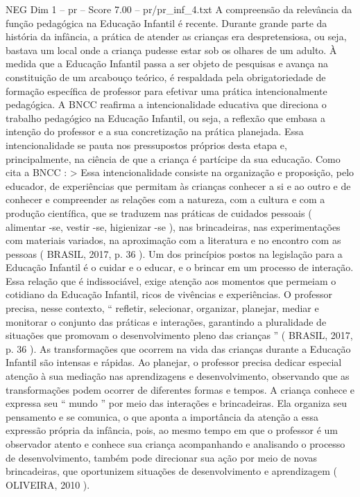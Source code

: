 \begin{textsample}{NEG Dim 1 – pr – Score 7.00 – pr/pr\_inf\_4.txt}  \label{ex:f1_neg_265}
A compreensão da relevância da função pedagógica na Educação Infantil é recente.
Durante grande parte da história da infância, a prática de atender as crianças era despretensiosa, ou seja, bastava um local onde a criança pudesse estar sob os olhares de um adulto.
À medida que a Educação Infantil passa a ser objeto de pesquisas e avança na constituição de um arcabouço teórico, é respaldada pela obrigatoriedade de formação específica de professor para efetivar uma prática intencionalmente pedagógica.
A BNCC reafirma a intencionalidade educativa que direciona o trabalho pedagógico na Educação Infantil, ou seja, a reflexão que embasa a intenção do professor e a sua concretização na prática planejada.
Essa intencionalidade se pauta nos pressupostos próprios desta etapa e, principalmente, na ciência de que a criança é partícipe da sua educação.
Como cita a BNCC : > Essa intencionalidade consiste na organização e proposição, pelo educador, de experiências que permitam às crianças conhecer a si e ao outro e de conhecer e compreender as relações com a natureza, com a cultura e com a produção científica, que se traduzem nas práticas de cuidados pessoais ( alimentar -se, vestir -se, higienizar -se ), nas brincadeiras, nas experimentações com materiais variados, na aproximação com a literatura e no encontro com as pessoas ( BRASIL, 2017, p. 36 ).
Um dos princípios postos na legislação para a Educação Infantil é o cuidar e o educar, e o brincar em um processo de interação.
Essa relação que é indissociável, exige atenção aos momentos que permeiam o cotidiano da Educação Infantil, ricos de vivências e experiências.
O professor precisa, nesse contexto, “ refletir, selecionar, organizar, planejar, mediar e monitorar o conjunto das práticas e interações, garantindo a pluralidade de situações que promovam o desenvolvimento pleno das crianças ” ( BRASIL, 2017, p. 36 ).
As transformações que ocorrem na vida das crianças durante a Educação Infantil são intensas e rápidas.
Ao planejar, o professor precisa dedicar especial atenção à sua mediação nas aprendizagens e desenvolvimento, observando que as transformações podem ocorrer de diferentes formas e tempos.
A criança conhece e expressa seu “ mundo ” por meio das interações e brincadeiras.
Ela organiza seu pensamento e se comunica, o que aponta a importância da atenção a essa expressão própria da infância, pois, ao mesmo tempo em que o professor é um observador atento e conhece sua criança acompanhando e analisando o processo de desenvolvimento, também pode direcionar sua ação por meio de novas brincadeiras, que oportunizem situações de desenvolvimento e aprendizagem ( OLIVEIRA, 2010 ).

\end{textsample}

